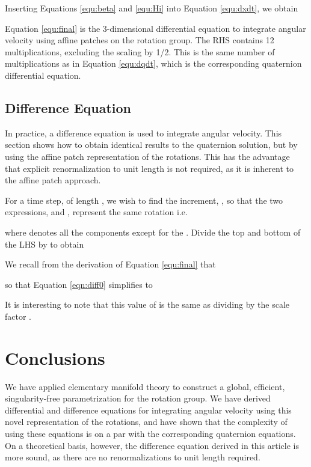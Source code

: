 \documentclass{gen-j-l}
\theoremstyle{definition}
\theoremstyle{remark}
\numberwithin{equation}{section}
\begin{document}
Inserting Equations \ref{equ:beta} and \ref{equ:Hi} into Equation \ref{equ:dxdt}, we
obtain



Equation \ref{equ:final} is the 3-dimensional differential equation to integrate angular
velocity using affine patches on the rotation group.
 The RHS contains 12 multiplications, excluding the scaling by 1/2.  This is
the same number of multiplications as in Equation \ref{equ:dqdt}, which is the 
corresponding quaternion differential equation.

\subsection{Difference Equation}

In practice, a difference equation is used to integrate
angular velocity.  This section shows how to obtain
identical results to the quaternion solution, but by using
the affine patch representation of the rotations.  This has 
the advantage that explicit renormalization to unit length is not required,
as it is inherent to the affine patch approach.

For a time step, of length , we wish to find
the  increment, , so that the two expressions,
 and ,
represent the same rotation i.e.



where  denotes all the components except for the .
Divide the top and bottom of the LHS by  to obtain



We recall from the derivation of Equation \ref{equ:final} that


so that Equation \ref{eqn:diff0} simplifies to


It is interesting to note that this value of 
is the same as dividing  by the scale factor
.

\section{Conclusions}
\label{sec:conclusion}

We have applied elementary manifold theory to construct a global, efficient,
singularity-free parametrization for the rotation group.  We have
derived differential and difference equations 
for integrating angular velocity
using this novel representation of the rotations, and have shown that
the complexity of using these equations is on a par with
the corresponding quaternion equations.  On a theoretical
basis, however, the difference equation
derived in this article is
more sound, as there are no renormalizations to unit
length required.
\end{document}

